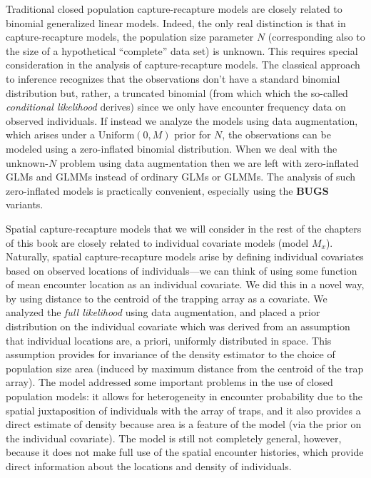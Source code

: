 Traditional closed population capture-recapture models are closely
related to binomial generalized linear models.  Indeed, the only real
distinction is that in capture-recapture models, the population size
parameter $N$ (corresponding also to the size of a hypothetical
``complete'' data set) is unknown.  This requires special
consideration in the analysis of capture-recapture models. The
classical approach to inference recognizes that the observations don't
have a standard binomial distribution but, rather, a truncated
binomial (from which which the so-called {\it conditional likelihood}
derives) since we only have encounter frequency data on observed
individuals. If instead we analyze the models using data augmentation,
which arises under a $\mbox{Uniform}(0,M)$ prior for $N$,
the observations can be modeled using a zero-inflated binomial
distribution. When we deal with the unknown-$N$ problem using
data augmentation then we are left with zero-inflated GLMs and GLMMs
instead of ordinary GLMs or GLMMs. The analysis of such zero-inflated
models is practically convenient, especially using the
{\bf BUGS} variants.

Spatial capture-recapture models that we will consider in the rest of
the chapters of this book are closely related to
individual covariate models (model $M_{x}$). Naturally, spatial capture-recapture
models arise by defining individual covariates based on observed
locations of individuals---we can think of using some function of
mean encounter location as an individual covariate. We did this in a
novel way, by using distance to the centroid of the trapping array as
a covariate. We analyzed the {\it full likelihood} using data
augmentation, and placed a prior distribution on the individual
covariate which was derived from an assumption that individual
locations are, a priori, uniformly distributed in space. This
assumption provides for invariance of the density estimator to the
choice of population size area (induced by maximum distance from the
centroid of the trap array). The model addressed some important problems in the
use of closed population models: it allows for heterogeneity in
encounter probability due to the spatial juxtaposition of individuals
with the array of traps, and it 
also provides a direct estimate of density because area is a feature
of the model (via the prior on the individual covariate). The model is
still not completely general, however, because it does not make full use of
the spatial encounter histories, which provide direct
information about the locations and density of individuals.  

